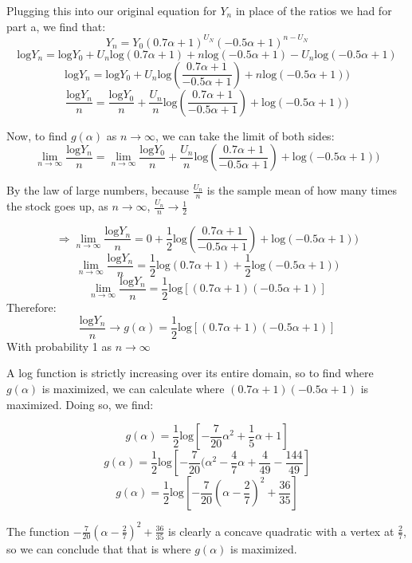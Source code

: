 \documentclass{article}
\begin{document}
Plugging this into our original equation for $Y_{n}$ in place of the ratios we had for part a, we find that:
$$Y_{n} = Y_{0}(0.7\alpha + 1)^{U_{N}}(-0.5\alpha + 1)^{n - U_{N}}$$
$$\text{log}Y_{n} = \text{log}Y_{0} + U_{n} \text{log}(0.7\alpha + 1) + n \text{log}(-0.5\alpha + 1) - U_{n} \text{log}(-0.5\alpha + 1)$$
$$\text{log}Y_{n} = \text{log}Y_{0} + U_{n} \text{log}(\frac{0.7\alpha + 1}{-0.5\alpha + 1}) + n \text{log}(-0.5\alpha + 1))$$
$$\frac{\text{log}Y_{n}}{n} = \frac{\text{log}Y_{0}}{n} + \frac{U_{n}}{n} \text{log}(\frac{0.7\alpha + 1}{-0.5\alpha + 1}) + \text{log}(-0.5\alpha + 1))$$

Now, to find $g(\alpha)$ as $n \rightarrow \infty$, we can take the limit of both sides:
$$\lim_{n \rightarrow \infty} \frac{\text{log}Y_{n}}{n} = \lim_{n \rightarrow \infty} \frac{\text{log}Y_{0}}{n} + \frac{U_{n}}{n} \text{log}(\frac{0.7\alpha + 1}{-0.5\alpha + 1}) + \text{log}(-0.5\alpha + 1))$$

By the law of large numbers, because $\frac{U_{n}}{n}$ is the sample mean of how many times the stock goes up, as $n \rightarrow \infty$, $\frac{U_{n}}{n} \rightarrow \frac{1}{2}$

$$\Rightarrow \lim_{n \rightarrow \infty} \frac{\text{log}Y_{n}}{n} = 0 + \frac{1}{2} \text{log}(\frac{0.7\alpha + 1}{-0.5\alpha + 1}) + \text{log}(-0.5\alpha + 1))$$
$$\lim_{n \rightarrow \infty} \frac{\text{log}Y_{n}}{n} = \frac{1}{2} \text{log}(0.7\alpha + 1) + \frac{1}{2}\text{log}(-0.5\alpha + 1))$$
$$\lim_{n \rightarrow \infty} \frac{\text{log}Y_{n}}{n} = \frac{1}{2} \text{log}[(0.7\alpha + 1)(-0.5\alpha + 1)]$$
Therefore:
$$\frac{\text{log}Y_{n}}{n} \rightarrow g(\alpha) = \frac{1}{2} \text{log}[(0.7\alpha + 1)(-0.5\alpha + 1)]$$
With probability 1 as $n \rightarrow \infty$

A log function is strictly increasing over its entire domain, so to find where $g(\alpha)$ is maximized, we can calculate where $(0.7 \alpha + 1)(-0.5 \alpha + 1)$ is maximized. Doing so, we find:

$$g(\alpha) = \frac{1}{2} \text{log}[-\frac{7}{20}\alpha^{2} + \frac{1}{5}\alpha + 1]$$
$$g(\alpha) = \frac{1}{2} \text{log}[-\frac{7}{20}(\alpha^{2} - \frac{4}{7}\alpha + \frac{4}{49} - \frac{144}{49}]$$
$$g(\alpha) = \frac{1}{2} \text{log}[-\frac{7}{20}(\alpha - \frac{2}{7})^{2} + \frac{36}{35}]$$

The function $-\frac{7}{20}(\alpha - \frac{2}{7})^{2} + \frac{36}{35}$ is clearly a concave quadratic with a vertex at $\frac{2}{7}$, so we can conclude that that is where $g(\alpha)$ is maximized.
\end{document}

